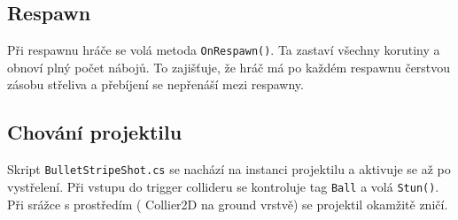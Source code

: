 \subsection{Respawn}
Při respawnu hráče se volá metoda \texttt{OnRespawn()}. Ta zastaví všechny korutiny a obnoví plný počet nábojů. To zajišťuje, že hráč má po každém respawnu čerstvou zásobu střeliva a přebíjení se nepřenáší mezi respawny.

\subsection{Chování projektilu}
Skript \texttt{BulletStripeShot.cs} se nachází na instanci projektilu a aktivuje se až po vystřelení. Při vstupu do trigger collideru se kontroluje tag \texttt{Ball} a volá \texttt{Stun()}. Při srážce s prostředím ( Collier2D na ground vrstvě) se projektil okamžitě zničí.
